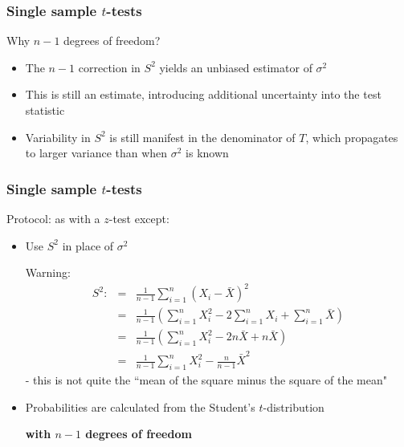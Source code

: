 \documentclass[t,8pt]{beamer}%
\begin{document}
\begin{frame}
	\frametitle{Single sample $t$-tests} 
	Why $n-1$ degrees of freedom?
    \begin{itemize}
        \item The $n-1$ correction in $S^2$ yields an unbiased estimator of $\sigma^2$
        \item This is still an estimate, introducing additional uncertainty into the test statistic
        \item Variability in $S^2$ is still manifest in the denominator of $T$, which propagates to larger variance than when $\sigma^2$ is known
    \end{itemize}
\end{frame}

\begin{frame}
	\frametitle{Single sample $t$-tests} 
	Protocol: as with a $z$-test except:
    \begin{itemize}
        \item Use $S^2$ in place of $\sigma^2$ \par
        Warning:
        \begin{eqnarray*}
            S^2:&=&\frac 1{n-1}\sum_{i=1}^n(X_i-\bar X)^2 \\
            &=&\frac 1{n-1}\left(\sum_{i=1}^nX_i^2-2\sum_{i=1}^nX_i+\sum_{i=1}^n\bar X\right)\\
            &=&\frac 1{n-1}\left(\sum_{i=1}^nX_i^2-2n\bar X+n\bar X\right)\\
            &=&\frac 1{n-1}\sum_{i=1}^nX_i^2-\frac n{n-1}\bar X^2
        \end{eqnarray*}
        - this is not quite the ``mean of the square minus the square of the mean"
        \item Probabilities are calculated from the Student's $t$-distribution \par
        {\bf with $n-1$ degrees of freedom}
    \end{itemize}
\end{frame}
\end{document}

